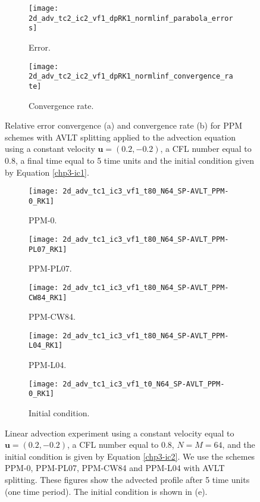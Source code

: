 \begin{figure}[!ht]
	\centering
	\begin{subfigure}{0.4\textwidth}
		\centering
		\texttt{[image: 2d\_adv\_tc2\_ic2\_vf1\_dpRK1\_normlinf\_parabola\_errors]}
		\caption{Error.\label{chp3-sec-exp-adv1-error}}
	\end{subfigure}
	\begin{subfigure}{0.4\textwidth}
		\centering
		\texttt{[image: 2d\_adv\_tc2\_ic2\_vf1\_dpRK1\_normlinf\_convergence\_rate]}
		\caption{Convergence rate.\label{chp3-sec-exp-adv1-CR}}
	\end{subfigure}
	\caption{Relative error convergence (a) and convergence rate (b) for PPM schemes with AVLT splitting
		applied to the advection equation using a constant velocity
		$\boldsymbol{u} = (0.2,-0.2)$, a CFL number equal to $0.8$, a final time equal to 5 time units
		and the initial condition given by Equation \eqref{chp3-ic1}.\label{chp3-sec-exp-adv1}}
\end{figure}

\begin{figure}[!htb]
	\centering
	\begin{subfigure}{0.4\textwidth}
		\centering
		\texttt{[image: 2d\_adv\_tc1\_ic3\_vf1\_t80\_N64\_SP-AVLT\_PPM-0\_RK1]}
		\caption{PPM-0.\label{chp3-sec-exp-adv2-a}}
	\end{subfigure}
	\begin{subfigure}{0.4\textwidth}
		\centering
		\texttt{[image: 2d\_adv\_tc1\_ic3\_vf1\_t80\_N64\_SP-AVLT\_PPM-PL07\_RK1]}
		\caption{PPM-PL07.\label{chp3-sec-exp-adv2-b}}
	\end{subfigure}
	
	\begin{subfigure}{0.4\textwidth}
		\centering
		\texttt{[image: 2d\_adv\_tc1\_ic3\_vf1\_t80\_N64\_SP-AVLT\_PPM-CW84\_RK1]}
		\caption{PPM-CW84.\label{chp3-sec-exp-adv2-c}}
	\end{subfigure}
	\begin{subfigure}{0.4\textwidth}
		\centering
		\texttt{[image: 2d\_adv\_tc1\_ic3\_vf1\_t80\_N64\_SP-AVLT\_PPM-L04\_RK1]}
		\caption{PPM-L04.\label{chp3-sec-exp-adv2-d}}
	\end{subfigure} 

	\begin{subfigure}{0.4\textwidth}
	\centering
	\texttt{[image: 2d\_adv\_tc1\_ic3\_vf1\_t0\_N64\_SP-AVLT\_PPM-0\_RK1]}
	\caption{Initial condition.\label{chp3-sec-exp-adv2-e}}
	\end{subfigure} 

	\caption{Linear advection experiment using a constant velocity equal to 
		$\boldsymbol{u} = (0.2,-0.2)$,
		a CFL number equal to $0.8$, $N=M=64$, and the initial condition is given by Equation \eqref{chp3-ic2}.
		We use the schemes PPM-0, PPM-PL07, PPM-CW84 and PPM-L04 with AVLT splitting.
		These figures show the advected profile after 5 time units (one time period).
		The initial condition is shown in (e).
		\label{chp3-sec-exp-adv2}}
\end{figure}

